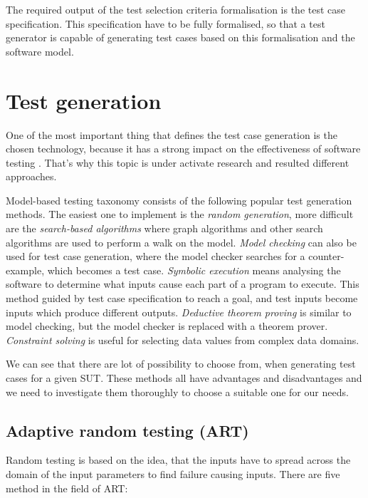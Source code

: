 The required output of the test selection criteria formalisation is the test case specification. This specification have to be fully formalised, so that a test generator is capable of generating test cases based on this formalisation and the software model.


\section{Test generation}
\label{sec:testgeneration}

One of the most important thing that defines the test case generation is the chosen technology, because it has a strong impact on the effectiveness of software testing \cite{testcasegen} \cite{mbttestcasegeneration}. That's why this topic is under activate research and resulted different approaches.

Model-based testing taxonomy consists of the following popular test generation methods. The easiest one to implement is the \textit{random generation}, more difficult are the \textit{search-based algorithms} where graph algorithms and other search algorithms are used to perform a walk on the model. \textit{Model checking} can also be used for test case generation, where the model checker searches for a counter-example, which becomes a test case. \textit{Symbolic execution} means analysing the software to determine what inputs cause each part of a program to execute. This method guided by test case specification to reach a goal, and test inputs become inputs which produce different outputs. \textit{Deductive theorem proving} is similar to model checking, but the model checker is replaced with a theorem prover. \textit{Constraint solving} is useful for selecting data values from complex data domains.

We can see that there are lot of possibility to choose from, when generating test cases for a given SUT. These methods all have advantages and disadvantages and we need to investigate them thoroughly to choose a suitable one for our needs.

\subsection{Adaptive random testing (ART)}
\label{sub:randomtesting}

Random testing is based on the idea, that the inputs have to spread across the domain of the input parameters to find failure causing inputs. There are five method in the field of ART:

